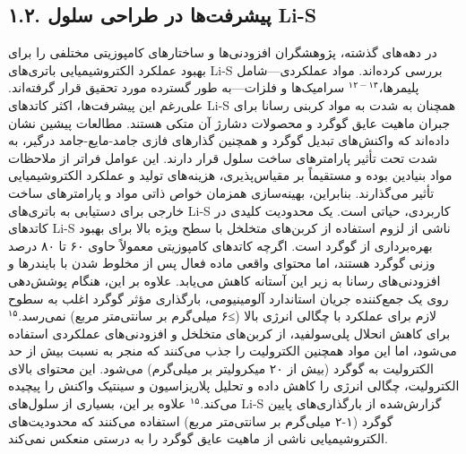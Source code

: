 \documentclass[12pt,a4paper,twocolumn]{article} %
\newcommand{\persian}[1]{\textfarsi{#1}}
\newcommand{\english}[1]{\textenglish{#1}}
\begin{document}
\subsection*{\persian{۱.۲. پیشرفت‌ها در طراحی سلول \english{Li-S}}}
\persian{
در دهه‌های گذشته، پژوهشگران افزودنی‌ها و ساختارهای کامپوزیتی مختلفی را برای بهبود عملکرد الکتروشیمیایی باتری‌های \english{Li-S} بررسی کرده‌اند. مواد عملکردی—شامل پلیمرها،$^{۱۲-۱۴}$ سرامیک‌ها و فلزات—به طور گسترده مورد تحقیق قرار گرفته‌اند. علی‌رغم این پیشرفت‌ها، اکثر کاتدهای \english{Li-S} همچنان به شدت به مواد کربنی رسانا برای جبران ماهیت عایق گوگرد و محصولات دشارژ آن متکی هستند. مطالعات پیشین نشان داده‌اند که واکنش‌های تبدیل گوگرد و همچنین گذارهای فازی جامد-مایع-جامد درگیر، به شدت تحت تأثیر پارامترهای ساخت سلول قرار دارند. این عوامل فراتر از ملاحظات مواد بنیادین بوده و مستقیماً بر مقیاس‌پذیری، هزینه‌های تولید و عملکرد الکتروشیمیایی تأثیر می‌گذارند. بنابراین، بهینه‌سازی همزمان خواص ذاتی مواد و پارامترهای ساخت خارجی برای دستیابی به باتری‌های \english{Li-S} کاربردی، حیاتی است.
}
\persian{
یک محدودیت کلیدی در کاتدهای \english{Li-S} ناشی از لزوم استفاده از کربن‌های متخلخل با سطح ویژه بالا برای بهبود بهره‌برداری از گوگرد است. اگرچه کاتدهای کامپوزیتی معمولاً حاوی ۶۰ تا ۸۰ درصد وزنی گوگرد هستند، اما محتوای واقعی ماده فعال پس از مخلوط شدن با بایندرها و افزودنی‌های رسانا به زیر این آستانه کاهش می‌یابد. علاوه بر این، هنگام پوشش‌دهی روی یک جمع‌کننده جریان استاندارد آلومینیومی، بارگذاری مؤثر گوگرد اغلب به سطوح لازم برای عملکرد با چگالی انرژی بالا (≥۶ میلی‌گرم بر سانتی‌متر مربع) نمی‌رسد.$^{۱۵}$ برای کاهش انحلال پلی‌سولفید، از کربن‌های متخلخل و افزودنی‌های عملکردی استفاده می‌شود، اما این مواد همچنین الکترولیت را جذب می‌کنند که منجر به نسبت بیش از حد الکترولیت به گوگرد (بیش از ۲۰ میکرولیتر بر میلی‌گرم) می‌شود. این محتوای بالای الکترولیت، چگالی انرژی را کاهش داده و تحلیل پلاریزاسیون و سینتیک واکنش را پیچیده می‌کند.$^{۱۵}$
}
\persian{
علاوه بر این، بسیاری از سلول‌های \english{Li-S} گزارش‌شده از بارگذاری‌های پایین گوگرد (۱-۲ میلی‌گرم بر سانتی‌متر مربع) استفاده می‌کنند که محدودیت‌های الکتروشیمیایی ناشی از ماهیت عایق گوگرد را به درستی منعکس نمی‌کند.
}


\end{document}

